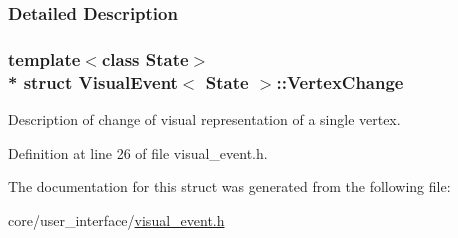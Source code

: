 \subsubsection{Detailed Description}
\subsubsection*{template$<$class State$>$\\*
struct Visual\+Event$<$ State $>$\+::\+Vertex\+Change}

Description of change of visual representation of a single vertex. 

Definition at line 26 of file visual\+\_\+event.\+h.



The documentation for this struct was generated from the following file\+:\begin{DoxyCompactItemize}
\item 
core/user\+\_\+interface/\hyperlink{visual__event_8h}{visual\+\_\+event.\+h}\end{DoxyCompactItemize}
